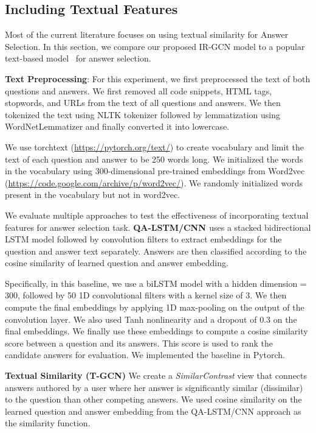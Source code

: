 \subsection{Including Textual Features}
Most of the current literature focuses on using textual similarity for Answer Selection. In this section, we compare our proposed IR-GCN model to a popular text-based model~\cite{Tan2015} for answer selection.

\noindent
\textbf{Text Preprocessing}: For this experiment, we first preprocessed the text of both questions and answers.
We first removed all code snippets, HTML tags, stopwords, and URLs from the text of all questions and answers. We then tokenized the text using NLTK tokenizer followed by lemmatization using WordNetLemmatizer and finally converted it into lowercase.

We use torchtext (\url{https://pytorch.org/text/}) to create vocabulary and limit the text of each question and answer to be 250 words long. We initialized the words in the vocabulary using 300-dimensional pre-trained embeddings from Word2vec (\url{https://code.google.com/archive/p/word2vec/}). We randomly initialized words present in the vocabulary but not in word2vec.

We evaluate multiple approaches to test the effectiveness of incorporating textual features for answer selection task.
\noindent
\textbf{QA-LSTM/CNN \cite{Tan2015}} uses a stacked bidirectional LSTM model followed by convolution filters to extract embeddings for the question and answer text separately. Answers are then classified according to the cosine similarity of learned question and answer embedding.

Specifically, in this baseline, we use a biLSTM model with a hidden dimension = 300, followed by 50 1D convolutional filters with a kernel size of 3. We then compute the final embeddings by applying 1D max-pooling on the output of the convolution layer. We also used Tanh nonlinearity and a dropout of 0.3 on the final embeddings. We finally use these embeddings to compute a cosine similarity score between a question and its answers. This score is used to rank the candidate answers for evaluation. We implemented the baseline in Pytorch.

\noindent
\textbf{Textual Similarity (T-GCN)} We create a \textit{SimilarContrast} view that connects answers authored by a user where her answer is significantly similar (dissimilar) to the question than other competing answers. We used cosine similarity on the learned question and answer embedding from the QA-LSTM/CNN approach as the similarity function.

